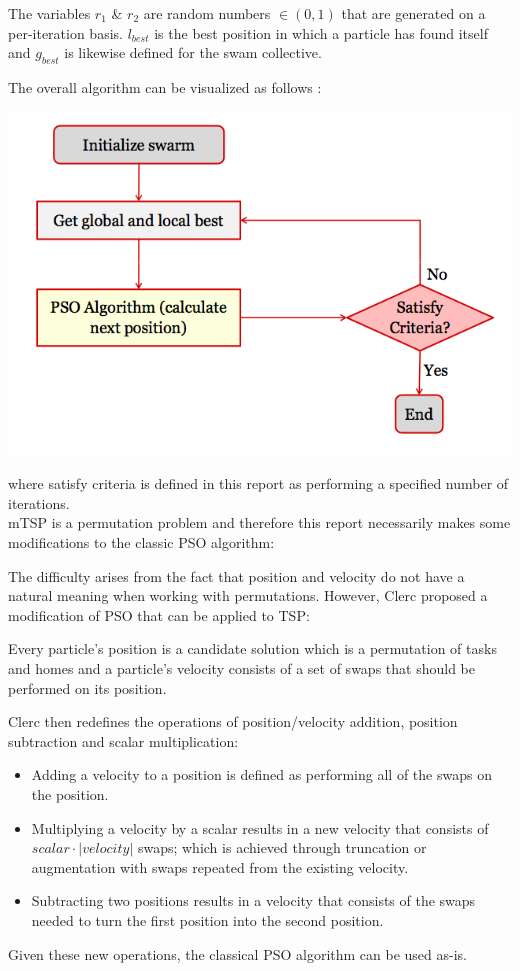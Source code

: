 \documentclass[a4paper]{article}
\begin{document}
The variables $r_1$ \& $r_2$ are random numbers $\in (0,1)$ that are generated on a per-iteration basis. $l_\mathit{best}$ is the best position in which a particle has found itself and $g_\mathit{best}$ is likewise defined for the swam collective.

The overall algorithm can be visualized as follows \cite{PSOFigure}:

\includegraphics[width=1\textwidth]{images/PSO.png}

where satisfy criteria is defined in this report as performing a specified number of iterations.\\

mTSP is a permutation problem and therefore this report necessarily makes some modifications to the classic PSO algorithm:

The difficulty arises from the fact that position and velocity do not have a natural meaning when working
with permutations. However, Clerc\cite{PermutationPSO} proposed a modification of PSO that can be applied to TSP:

Every particle's position is a candidate solution which is a permutation of tasks and homes and
a particle's velocity consists of a set of swaps that should be performed on its position.

Clerc then redefines the operations of position/velocity addition, position subtraction and scalar multiplication:
\begin{itemize}
\item Adding a velocity to a position is defined as performing all of the swaps on the position.
\item Multiplying a velocity by a scalar results in a new velocity that consists of $scalar\cdot |velocity|$ swaps; which is achieved through truncation or augmentation with swaps repeated from the existing velocity.
\item Subtracting two positions results in a velocity that consists of the swaps needed to turn the first position into the second position.
\end{itemize}
Given these new operations, the classical PSO algorithm can be used as-is.
\end{document}
